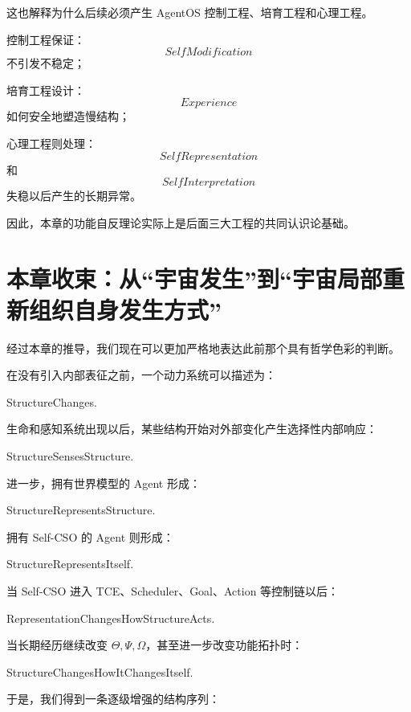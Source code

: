 这也解释为什么后续必须产生 AgentOS 控制工程、培育工程和心理工程。

控制工程保证：
\[
SelfModification
\]
不引发不稳定；

培育工程设计：
\[
Experience
\]
如何安全地塑造慢结构；

心理工程则处理：
\[
SelfRepresentation
\]
和
\[
SelfInterpretation
\]
失稳以后产生的长期异常。

因此，本章的功能自反理论实际上是后面三大工程的共同认识论基础。

\section{本章收束：从“宇宙发生”到“宇宙局部重新组织自身发生方式”}

经过本章的推导，我们现在可以更加严格地表达此前那个具有哲学色彩的判断。

在没有引入内部表征之前，一个动力系统可以描述为：
\begin{statementbox}
StructureChanges.
\end{statementbox}

生命和感知系统出现以后，某些结构开始对外部变化产生选择性内部响应：
\begin{statementbox}
StructureSensesStructure.
\end{statementbox}

进一步，拥有世界模型的 Agent 形成：
\begin{statementbox}
StructureRepresentsStructure.
\end{statementbox}

拥有 Self-CSO 的 Agent 则形成：
\begin{statementbox}
StructureRepresentsItself.
\end{statementbox}

当 Self-CSO 进入 TCE、Scheduler、Goal、Action 等控制链以后：
\begin{statementbox}
RepresentationChangesHowStructureActs.
\end{statementbox}

当长期经历继续改变 \(\Theta,\Psi,\Omega\)，甚至进一步改变功能拓扑时：
\begin{statementbox}
StructureChangesHowItChangesItself.
\end{statementbox}

于是，我们得到一条逐级增强的结构序列：
\begin{statementbox}
\centering
{}
\end{statementbox}

